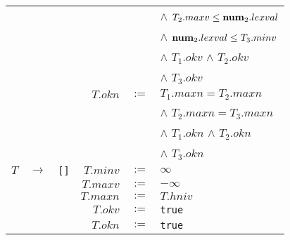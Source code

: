 \documentclass[class=article]{standalone}
\begin{document}
{\begin{tabular}{|rcl|rcl|}
        &               &                                                                                                                                                 &           &      & $\wedge$ $T_2.maxv \leq {\bf num}_2.lexval$ \\
        &               &                                                                                                                                                 &           &      & $\wedge$ ${\bf num}_2.lexval \leq T_3.minv$\\
        &               &                                                                                                                                                 &           &      & $\wedge$ $T_1.okv$ $\wedge$ $T_2.okv$\\
        &               &                                                                                                                                                 &           &      & $\wedge$ $T_3.okv$\\
        &               &                                                                                                                                                 & $T.okn$   & $:=$ & $T_1.maxn = T_2.maxn$\\
        &               &                                                                                                                                                 &           &      & $\wedge$ $T_2.maxn = T_3.maxn$\\
        &               &                                                                                                                                                 &           &      & $\wedge$ $T_1.okn$ $\wedge$ $T_2.okn$\\
        &               &                                                                                                                                                 &           &      & $\wedge$ $T_3.okn$\\
    \hline
    $T$ & $\rightarrow$ & \lstinline[]$[]$  & $T.minv$ & $:=$ & $\infty$\\
        &               &                   & $T.maxv$ & $:=$ & $-\infty$\\
        &               &                   & $T.maxn$ & $:=$ & $T.hniv$\\
        &               &                   & $T.okv$ & $:=$ & \lstinline[]$true$\\
        &               &                   & $T.okn$ & $:=$ & \lstinline[]$true$\\
    \hline
  \end{tabular}
}
\end{document}
